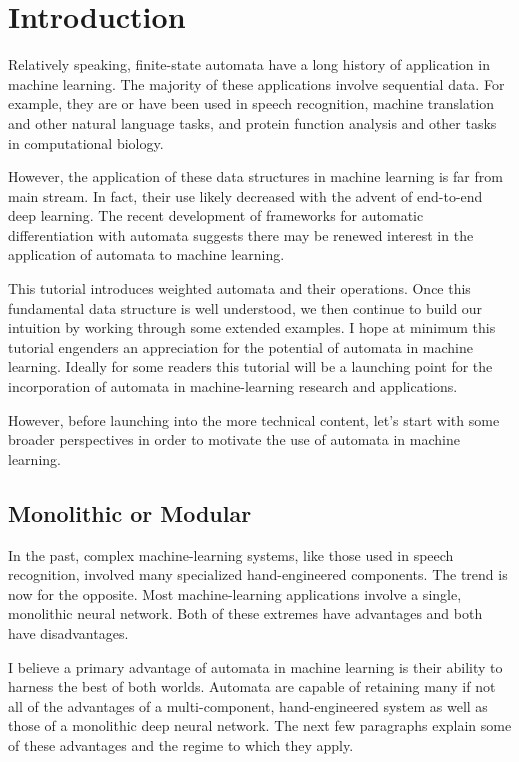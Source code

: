 \documentclass[main.tex]{subfiles}
\begin{document}
\section{Introduction}
\label{sec:introduction}

Relatively speaking, finite-state automata have a long history of application
in machine learning. The majority of these applications involve sequential
data.  For example, they are or have been used in speech recognition, machine
translation and other natural language tasks, and protein function analysis and
other tasks in computational biology.

However, the application of these data structures in machine learning is far
from main stream. In fact, their use likely decreased with the advent of
end-to-end deep learning. The recent development of frameworks for automatic
differentiation with automata suggests there may be renewed interest in the
application of automata to machine learning.

This tutorial introduces weighted automata and their operations. Once this
fundamental data structure is well understood, we then continue to build our
intuition by working through some extended examples.  I hope at minimum this
tutorial engenders an appreciation for the potential of automata in machine
learning. Ideally for some readers this tutorial will be a launching point for
the incorporation of automata in machine-learning research and applications.

However, before launching into the more technical content, let's start with
some broader perspectives in order to motivate the use of automata in machine
learning.

\subsection{Monolithic or Modular}

In the past, complex machine-learning systems, like those used in speech
recognition, involved many specialized hand-engineered components. The trend
is now for the opposite. Most machine-learning applications involve a single,
monolithic neural network. Both of these extremes have advantages and both have
disadvantages.

I believe a primary advantage of automata in machine learning is their
ability to harness the best of both worlds. Automata are capable of retaining
many if not all of the advantages of a multi-component, hand-engineered system
as well as those of a monolithic deep neural network. The next few paragraphs
explain some of these advantages and the regime to which they apply.
\end{document}
